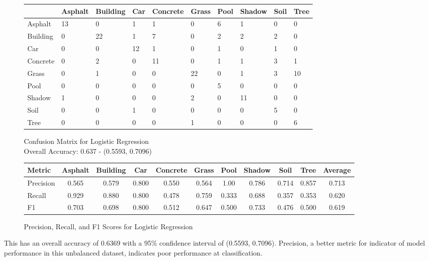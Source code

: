 \documentclass[11pt]{article}
\begin{document}
\begin{figure}
    \centering
    \begin{tabular}{p{1.5cm} p{1cm} p{1cm} p{1cm} p{1.3cm} p{1cm} p{1 cm} p{1cm} p{1cm} p{1cm}}
      \toprule
      & Asphalt & Building & Car & Concrete & Grass & Pool & Shadow & Soil & Tree \\
      \midrule
      Asphalt & 13 & 0 & 1 & 1 & 0 & 6 & 1 & 0 & 0 \\
      Building & 0 & 22 & 1 & 7 & 0 & 2 & 2 & 2 & 0 \\
      Car & 0 & 0 & 12 & 1 & 0 & 1 & 0 & 1 & 0 \\
      Concrete & 0 & 2 & 0 & 11 & 0 & 1 & 1 & 3 & 1 \\
      Grass & 0 & 1 & 0 & 0 & 22 & 0 & 1 & 3 & 10 \\
      Pool & 0 & 0 & 0 & 0 & 0 & 5 & 0 & 0 & 0 \\
      Shadow & 1 & 0 & 0 & 0 & 2 & 0 & 11 & 0 & 0 \\
      Soil & 0 & 0 & 1 & 0 & 0 & 0 & 0 & 5 & 0 \\
      Tree & 0 & 0 & 0 & 0 & 1 & 0 & 0 & 0 & 6 \\
      \bottomrule
    \end{tabular}
    \caption{Confusion Matrix for Logistic Regression \\ Overall Accuracy: 0.637 - (0.5593, 0.7096)}
    \label{tab:confusion_matrix}
    \end{figure}%
 
\begin{figure}
  \centering
  \begin{tabular}{lcccccccccc}
    \toprule
    Metric & Asphalt & Building & Car & Concrete & Grass & Pool & Shadow & Soil & Tree & Average \\
    \midrule
    Precision & 0.565 & 0.579 & 0.800 & 0.550 & 0.564 & 1.00 & 0.786 & 0.714 & 0.857 & 0.713\\
    Recall & 0.929 & 0.880 & 0.800 & 0.478 & 0.759 & 0.333 & 0.688 & 0.357 & 0.353 & 0.620\\
    F1 & 0.703 & 0.698 & 0.800 & 0.512 & 0.647 & 0.500 & 0.733 & 0.476 & 0.500 & 0.619\\
    \bottomrule
  \end{tabular}
  \caption{Precision, Recall, and F1 Scores for Logistic Regression}
  \label{tab:precision_recall_f1_transposed}
\end{figure}

This has an overall accuracy of 0.6369 with a 95\% confidence interval of (0.5593, 0.7096). Precision, a better metric for indicator of model performance in this unbalanced dataset, indicates poor performance at classification.\\
\end{document}
